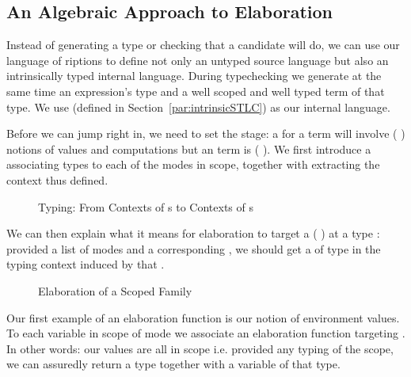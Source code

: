 \subsection{An Algebraic Approach to Elaboration}\label{section:elaboration}

Instead of generating a type or checking that a candidate will do, we can use
our language of riptions to define not only an untyped source language
but also an intrinsically typed internal language. During typechecking we generate
at the same time an expression's type and a well scoped and well typed term of
that type. We use  (defined in Section~\ref{par:intrinsicSTLC}) as our
internal language.

Before we can jump right in, we need to set the stage: a  for a
 term will involve ({ }) notions of values and
computations but an  term is ({ }). We first
introduce a  associating types to each of the modes in scope, together
with  extracting the context thus defined.

\begin{figure}[h]
\begin{minipage}[t]{0.4\textwidth}
\end{minipage}
\begin{minipage}[t]{0.5\textwidth}
\end{minipage}
\caption{Typing: From Contexts of s to Contexts of s\label{fig:typingmodes}}
\end{figure}

We can then explain what it means for elaboration to target  a
({ }) at a type : provided a list of modes and a
corresponding , we should get a  of type  in the
typing context induced by that .

\begin{figure}[h]
\caption{Elaboration of a Scoped Family}
\end{figure}

Our first example of an elaboration function is our notion of environment values.
To each variable in scope of mode  we associate an elaboration function
targeting . In other words: our values are all in scope i.e. provided any
typing of the scope, we can assuredly return a type together with a variable of
that type.

